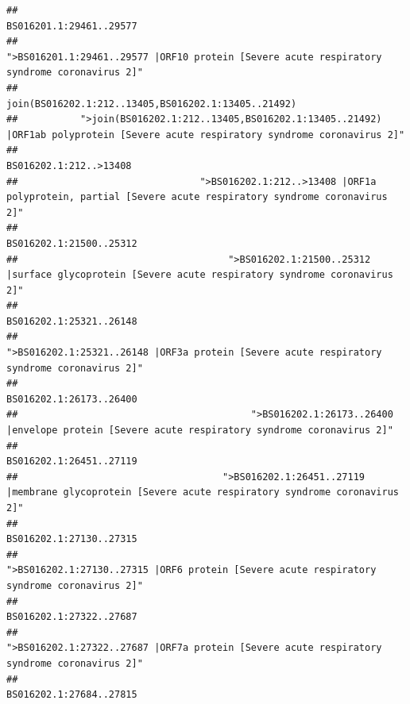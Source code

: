 \documentclass[
]{article}
\begin{document}
\begin{verbatim}
##                                                                                                                BS016201.1:29461..29577 
##                                            ">BS016201.1:29461..29577 |ORF10 protein [Severe acute respiratory syndrome coronavirus 2]" 
##                                                                                    join(BS016202.1:212..13405,BS016202.1:13405..21492) 
##           ">join(BS016202.1:212..13405,BS016202.1:13405..21492) |ORF1ab polyprotein [Severe acute respiratory syndrome coronavirus 2]" 
##                                                                                                                 BS016202.1:212..>13408 
##                                ">BS016202.1:212..>13408 |ORF1a polyprotein, partial [Severe acute respiratory syndrome coronavirus 2]" 
##                                                                                                                BS016202.1:21500..25312 
##                                     ">BS016202.1:21500..25312 |surface glycoprotein [Severe acute respiratory syndrome coronavirus 2]" 
##                                                                                                                BS016202.1:25321..26148 
##                                            ">BS016202.1:25321..26148 |ORF3a protein [Severe acute respiratory syndrome coronavirus 2]" 
##                                                                                                                BS016202.1:26173..26400 
##                                         ">BS016202.1:26173..26400 |envelope protein [Severe acute respiratory syndrome coronavirus 2]" 
##                                                                                                                BS016202.1:26451..27119 
##                                    ">BS016202.1:26451..27119 |membrane glycoprotein [Severe acute respiratory syndrome coronavirus 2]" 
##                                                                                                                BS016202.1:27130..27315 
##                                             ">BS016202.1:27130..27315 |ORF6 protein [Severe acute respiratory syndrome coronavirus 2]" 
##                                                                                                                BS016202.1:27322..27687 
##                                            ">BS016202.1:27322..27687 |ORF7a protein [Severe acute respiratory syndrome coronavirus 2]" 
##                                                                                                                BS016202.1:27684..27815 

\end{verbatim}
\end{document}
